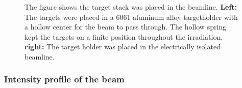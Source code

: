 \begin{figure}%
    \centering
    \caption{The figure shows the target stack was placed in the beamline. \textbf{Left:} The targets were placed in a 6061 aluminum alloy targetholder with a hollow center for the beam to pass through. The hollow spring kept the targets on a finite position throughout the irradiation. \textbf{right:} The target holder was placed in the electrically isolated beamline. }%
    \label{fig:targetstack}%
\end{figure}






\subsubsection{Intensity profile of the beam}

